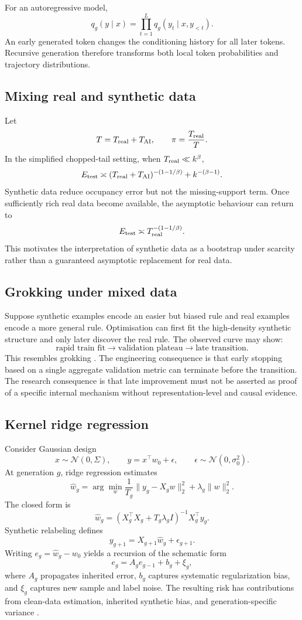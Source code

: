 For an autoregressive model,
\[
q_g(y\mid x)
=\prod_{t=1}^{L}q_g(y_t\mid x,y_{<t}).
\]
An early generated token changes the conditioning history for all later tokens. Recursive generation therefore transforms both local token probabilities and trajectory distributions.

\subsection{Mixing real and synthetic data}

Let
\[
T=T_{\mathrm{real}}+T_{\mathrm{AI}},\qquad
\pi=\frac{T_{\mathrm{real}}}{T}.
\]
In the simplified chopped-tail setting, when $T_{\mathrm{real}}\ll k^\beta$,
\[
E_{\mathrm{test}}
\asymp (T_{\mathrm{real}}+T_{\mathrm{AI}})^{-(1-1/\beta)}
+ k^{-(\beta-1)}.
\]
Synthetic data reduce occupancy error but not the missing-support term. Once sufficiently rich real data become available, the asymptotic behaviour can return to
\[
E_{\mathrm{test}}
\asymp T_{\mathrm{real}}^{-(1-1/\beta)}.
\]
This motivates the interpretation of synthetic data as a bootstrap under scarcity rather than a guaranteed asymptotic replacement for real data.

\subsection{Grokking under mixed data}

Suppose synthetic examples encode an easier but biased rule and real examples encode a more general rule. Optimisation can first fit the high-density synthetic structure and only later discover the real rule. The observed curve may show:
\[
\text{rapid train fit}
\rightarrow \text{validation plateau}
\rightarrow \text{late transition}.
\]
This resembles grokking \citep{power2022grokking}. The engineering consequence is that early stopping based on a single aggregate validation metric can terminate before the transition. The research consequence is that late improvement must not be asserted as proof of a specific internal mechanism without representation-level and causal evidence.

\subsection{Kernel ridge regression}

Consider Gaussian design
\[
x\sim\mathcal N(0,\Sigma),
\qquad y=x^\top w_0+\epsilon,
\qquad \epsilon\sim\mathcal N(0,\sigma_0^2).
\]
At generation $g$, ridge regression estimates
\[
\widehat w_g
=\arg\min_w
\frac{1}{T_g}\|y_g-X_gw\|_2^2
+\lambda_g\|w\|_2^2.
\]
The closed form is
\[
\widehat w_g
=\left(X_g^\top X_g+T_g\lambda_g I\right)^{-1}X_g^\top y_g.
\]
Synthetic relabeling defines
\[
y_{g+1}=X_{g+1}\widehat w_g+\epsilon_{g+1}.
\]
Writing $e_g=\widehat w_g-w_0$ yields a recursion of the schematic form
\[
e_g=A_ge_{g-1}+b_g+\xi_g,
\]
where $A_g$ propagates inherited error, $b_g$ captures systematic regularization bias, and $\xi_g$ captures new sample and label noise. The resulting risk has contributions from clean-data estimation, inherited synthetic bias, and generation-specific variance \citep{dohmatob2024regression}.

